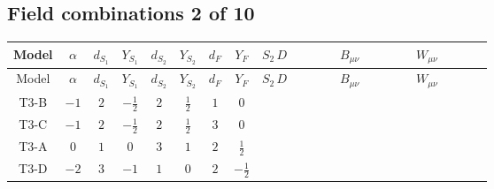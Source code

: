 \documentclass[8pt]{article}
\begin{document}
\begin{landscape}
\subsection*{Field combinations 2 of 10}
\begin{longtable}{@{}cccccccc >{\raggedright\arraybackslash}p{0.21\linewidth} >{\raggedright\arraybackslash}p{0.21\linewidth} >{\raggedright\arraybackslash}p{0.21\linewidth}@{}}
\toprule
Model & $\alpha$ & $d_{S_1}$ & $Y_{S_1}$ & $d_{S_2}$ & $Y_{S_2}$ & $d_F$ & $Y_F$ & $S_2\,D$ & $B_{\mu\nu}$ & $W_{\mu\nu}$ \\
\midrule
\endfirsthead
\toprule
Model & $\alpha$ & $d_{S_1}$ & $Y_{S_1}$ & $d_{S_2}$ & $Y_{S_2}$ & $d_F$ & $Y_F$ & $S_2\,D$ & $B_{\mu\nu}$ & $W_{\mu\nu}$ \\
\midrule
\endhead
T3-B & $-1$ & $2$ & $-\frac{1}{2}$ & $2$ & $\frac{1}{2}$ & $1$ & $0$ & \scriptsize\adjustbox{max width=\linewidth}{$\begin{gathered} +D_{\mu _1}\left(S_{2,j_1}\right){}^{\dagger } D_{\mu _1}\left(S_{2,j_1}\right)\end{gathered}$} &  &  \\
\midrule
T3-C & $-1$ & $2$ & $-\frac{1}{2}$ & $2$ & $\frac{1}{2}$ & $3$ & $0$ & \scriptsize\adjustbox{max width=\linewidth}{$\begin{gathered} +D_{\mu _1}\left(S_{2,j_1}\right){}^{\dagger } D_{\mu _1}\left(S_{2,j_1}\right)\end{gathered}$} &  & \scriptsize\adjustbox{max width=\linewidth}{$\begin{gathered} -\frac{\hbar  \left(W_{\mu _1\mu _2}^{A_1}\right){}^2}{\epsilon }\end{gathered}$} \\
\midrule
T3-A & $0$ & $1$ & $0$ & $3$ & $1$ & $2$ & $\frac{1}{2}$ & \scriptsize\adjustbox{max width=\linewidth}{$\begin{gathered} +D_{\mu _1}\left(S_{2,j_1}\right){}^{\dagger } D_{\mu _1}\left(S_{2,j_1}\right)\end{gathered}$} & \scriptsize\adjustbox{max width=\linewidth}{$\begin{gathered} -\frac{\hbar  B_{\mu _1\mu _2}^2}{2 \epsilon }\end{gathered}$} & \scriptsize\adjustbox{max width=\linewidth}{$\begin{gathered} -\frac{\hbar  \left(W_{\mu _1\mu _2}^{A_1}\right){}^2}{2 \epsilon }\end{gathered}$} \\
\midrule
T3-D & $-2$ & $3$ & $-1$ & $1$ & $0$ & $2$ & $-\frac{1}{2}$ & \scriptsize\adjustbox{max width=\linewidth}{$\begin{gathered} +D_{\mu _1}\left(S_2\right){}^{\dagger } D_{\mu _1}\left(S_2\right)\end{gathered}$} & \scriptsize\adjustbox{max width=\linewidth}{$\begin{gathered} -\frac{\hbar  B_{\mu _1\mu _2}^2}{2 \epsilon }\end{gathered}$} & \scriptsize\adjustbox{max width=\linewidth}{$\begin{gathered} -\frac{\hbar  \left(W_{\mu _1\mu _2}^{A_1}\right){}^2}{2 \epsilon }\end{gathered}$} \\

\end{longtable}
\end{landscape}
\end{document}
